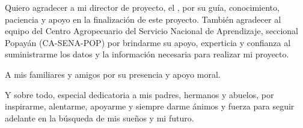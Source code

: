 
Quiero agradecer a mi director de proyecto, el \director, por su guía, conocimiento, paciencia  y apoyo en la finalización de este proyecto. También agradecer al  equipo del Centro Agropecuario del Servicio Nacional de Aprendizaje, seccional Popayán (CA-SENA-POP) por brindarme su apoyo, experticia y confianza al suministrarme los datos y la información necesaria para realizar mi proyecto.

A mis familiares y amigos por su presencia y apoyo moral.

Y sobre todo, especial dedicatoria a mis padres, hermanos y abuelos, por inspirarme, alentarme, apoyarme y siempre darme ánimos y fuerza para seguir adelante en la búsqueda de mis sueños y mi futuro.\\
